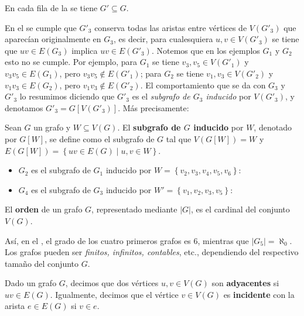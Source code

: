 \begin{Ejm}\label{Ejm:Contenencia}
   En cada fila de la  se tiene $G'\subseteq G$.
   
\end{Ejm}
En el  se cumple que $G'_3$ conserva todas las aristas entre vértices de $V(G'_3)$ que aparecían originalmente en $G_3$, es decir, para cualesquiera $u,v\in V(G'_3)$ se tiene que $uv\in E(G_3)$ implica $uv\in E(G'_3)$. Notemos que en los ejemplos $G_1$ y $G_2$ esto no se cumple. Por ejemplo, para $G_1$ se tiene $v_3,v_5\in V(G'_1)$ y $v_3v_5\in E(G_1)$, pero $v_3v_5 \notin E(G'_1)$; para $G_2$ se tiene $v_1,v_3\in V(G'_2)$ y $v_1v_3\in E(G_2)$, pero $v_1v_3\notin E(G'_2)$. El comportamiento que se da con $G_3$ y $G'_3$ lo resumimos diciendo que $G'_3$ es el \textit{subgrafo de $G_3$ inducido} por $V(G'_3)$, y denotamos $G'_3=G[V(G'_3)]$. Más precisamente:
\begin{Def}
   Sean $G$ un grafo y $W\subseteq V(G)$. El \textbf{subgrafo de $G$ inducido} por $W$, denotado por $G[W]$, se define como el subgrafo de $G$ tal que $V(G[W])=W$ y $E(G[W])=\left\lbrace uv\in E(G)\mid u,v\in W\right\rbrace$.
\end{Def}
\begin{Ejm}
   \phantom{o}
   \begin{itemize}
      \item $G_2$ es el subgrafo de $G_1$ inducido por $W=\left\lbrace v_2,v_3,v_4,v_5,v_6\right\rbrace$:
           
      \item $G_4$ es el subgrafo de $G_3$ inducido por $W'=\left\lbrace v_1,v_2,v_3,v_5\right\rbrace$:
           
   \end{itemize}
\end{Ejm}
\begin{Def}
   El \textbf{orden} de un grafo $G$, representado mediante $|G|$, es el cardinal del conjunto $V(G)$.
\end{Def}
Así, en el , el grado de los cuatro primeros grafos es $6$, mientras que $|G_5|=\aleph _0$. Los grafos pueden ser \textit{finitos, infinitos, contables}, etc., dependiendo del respectivo tamaño del conjunto $G$.
\begin{Def}
   Dado un grafo $G$, decimos que dos vértices $u,v\in V(G)$ son \textbf{adyacentes} si $uv\in E(G)$. Igualmente, decimos que el vértice $v\in V(G)$ es \textbf{incidente} con la arista $e\in E(G)$ si $v\in e$. 
\end{Def}
